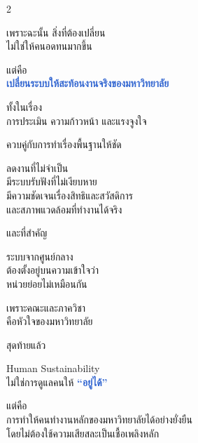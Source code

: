 \documentclass[10pt]{article}
\begin{document}
\begin{tcolorbox}[breakable,colback=panel,colframe=line,boxrule=0.5pt,arc=2mm,left=3mm,right=3mm,top=2mm,bottom=2mm]
\begin{multicols}{2}
\par เพราะฉะนั้น สิ่งที่ต้องเปลี่ยน\\ ไม่ใช่ให้คนอดทนมากขึ้น
\par แต่คือ\\ \textbf{\textcolor{highlight}{เปลี่ยนระบบให้สะท้อนงานจริงของมหาวิทยาลัย}}
\par ทั้งในเรื่อง\\ การประเมิน ความก้าวหน้า และแรงจูงใจ
\par ควบคู่กับการทำเรื่องพื้นฐานให้ชัด
\par ลดงานที่ไม่จำเป็น\\ มีระบบรับฟังที่ไม่เงียบหาย\\ มีความชัดเจนเรื่องสิทธิและสวัสดิการ\\ และสภาพแวดล้อมที่ทำงานได้จริง
\par และที่สำคัญ
\par ระบบจากศูนย์กลาง\\ ต้องตั้งอยู่บนความเข้าใจว่า\\ หน่วยย่อยไม่เหมือนกัน
\par เพราะคณะและภาควิชา\\ คือหัวใจของมหาวิทยาลัย
\par สุดท้ายแล้ว
\par Human Sustainability\\ ไม่ใช่การดูแลคนให้ \textbf{\textcolor{highlight}{“อยู่ได้”}}
\par แต่คือ\\ การทำให้คนทำงานหลักของมหาวิทยาลัยได้อย่างยั่งยืน\\ โดยไม่ต้องใช้ความเสียสละเป็นเชื้อเพลิงหลัก
\end{multicols}
\end{tcolorbox}

\clearpage
\end{document}
